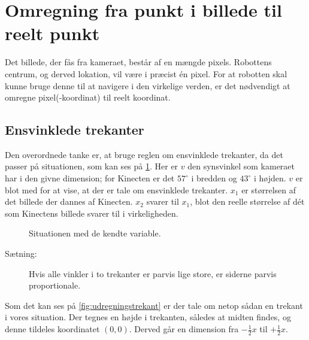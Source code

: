 \section{Omregning fra punkt i billede til reelt punkt}\label{lokalisering:punktomregning}
Det billede, der fås fra kameraet, består af en mængde pixels.
Robottens centrum, og derved lokation, vil være i præcist én pixel.
For at robotten skal kunne bruge denne til at navigere i den virkelige verden, er det nødvendigt at omregne pixel(-koordinat) til reelt koordinat.

\subsection{Ensvinklede trekanter}
Den overordnede tanke er, at bruge reglen om ensvinklede trekanter, da det passer på situationen, som kan ses på \cref{fig:kameratrekant}.
Her er $v$ den synsvinkel som kameraet har i den givne dimension; for Kinecten er det $57^\circ$ i bredden og $43^\circ$ i højden.
$v$ er blot med for at vise, at der er tale om ensvinklede trekanter.
$x_1$ er størrelsen af det billede der dannes af Kinecten.
$x_2$ svarer til $x_1$, blot den reelle størrelse af dét som Kinectens billede svarer til i virkeligheden.

\begin{figure}[h]
\centering
{}
\caption{Situationen med de kendte variable.}
\label{fig:kameratrekant}
\end{figure}

\begin{description}
\item[Sætning:]{Hvis alle vinkler i to trekanter er parvis lige store, er siderne parvis proportionale.}
\end{description}
Som det kan ses på \cref{fig:udregningstrekant} er der tale om netop sådan en trekant i vores situation.
Der tegnes en højde i trekanten, således at midten findes, og denne tildeles koordinatet $(0,0)$. 
Derved går en dimension fra $-\frac{1}{2}x$ til $+\frac{1}{2}x$.

